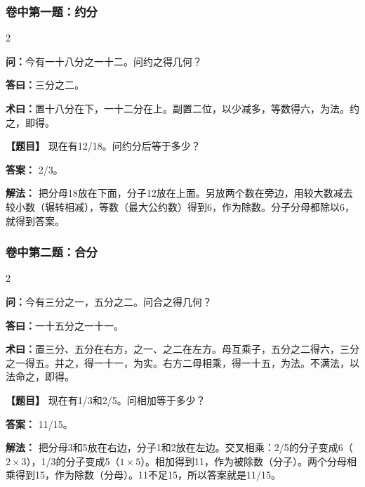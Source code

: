 \documentclass[11pt,a4paper]{article}
\begin{document}
\vspace{0.3cm}

\subsubsection*{卷中第一题：约分}
\begin{paracol}{2}
\begin{problemclassical}
\textbf{问：}今有一十八分之一十二。问约之得几何？

\textbf{答曰：}三分之二。

\textbf{术曰：}置十八分在下，一十二分在上。副置二位，以少减多，等数得六，为法。约之，即得。
\end{problemclassical}
\switchcolumn
\begin{problemmodern}
\textbf{【题目】} 现在有12/18。问约分后等于多少？

\textbf{答案：} 2/3。

\textbf{解法：} 把分母18放在下面，分子12放在上面。另放两个数在旁边，用较大数减去较小数（辗转相减），等数（最大公约数）得到6，作为除数。分子分母都除以6，就得到答案。
\end{problemmodern}
\end{paracol}

\vspace{0.3cm}

\subsubsection*{卷中第二题：合分}
\begin{paracol}{2}
\begin{problemclassical}
\textbf{问：}今有三分之一，五分之二。问合之得几何？

\textbf{答曰：}一十五分之一十一。

\textbf{术曰：}置三分、五分在右方，之一、之二在左方。母互乘子，五分之二得六，三分之一得五。并之，得一十一，为实。右方二母相乘，得一十五，为法。不满法，以法命之，即得。
\end{problemclassical}
\switchcolumn
\begin{problemmodern}
\textbf{【题目】} 现在有1/3和2/5。问相加等于多少？

\textbf{答案：} 11/15。

\textbf{解法：} 把分母3和5放在右边，分子1和2放在左边。交叉相乘：2/5的分子变成6（$2 \times 3$），1/3的分子变成5（$1 \times 5$）。相加得到11，作为被除数（分子）。两个分母相乘得到15，作为除数（分母）。11不足15，所以答案就是11/15。
\end{problemmodern}
\end{paracol}
\end{document}
